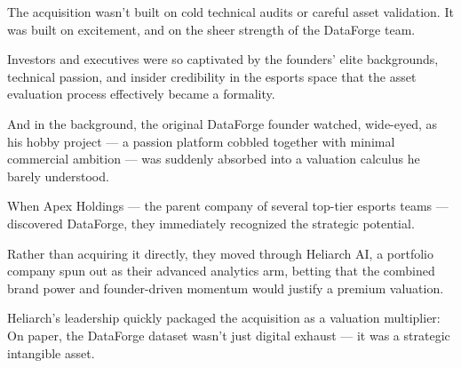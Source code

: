 The acquisition wasn’t built on cold technical audits or careful asset validation. It was built on excitement, and on the sheer strength of the DataForge team.

Investors and executives were so captivated by the founders’ elite backgrounds, technical passion, and insider credibility in the esports space that the asset evaluation process effectively became a formality.

And in the background, the original DataForge founder watched, wide-eyed, as his hobby project --- a passion platform cobbled together with minimal commercial ambition --- was suddenly absorbed into a valuation calculus he barely understood.

When Apex Holdings --- the parent company of several top-tier esports teams --- discovered DataForge, they immediately recognized the strategic potential.

Rather than acquiring it directly, they moved through Heliarch AI, a portfolio company spun out as their advanced analytics arm, betting that the combined brand power and founder-driven momentum would justify a premium valuation.

Heliarch’s leadership quickly packaged the acquisition as a valuation multiplier: On paper, the DataForge dataset wasn’t just digital exhaust --- it was a strategic intangible asset.

\medskip

